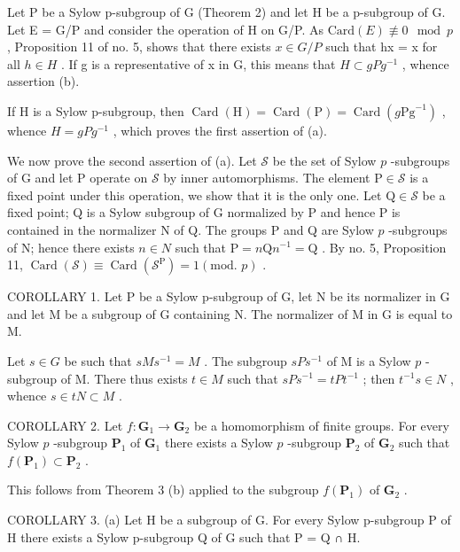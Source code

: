 Let P be a Sylow p-subgroup of G (Theorem 2) and let H be a p-subgroup of G. Let E = G/P and consider the operation of H on G/P. As \(\text{Card}(E) \not\equiv 0 \mod p\) , Proposition 11 of no. 5, shows that there exists \(x \in G/P\) such that hx = x for all \(h \in H\) . If g is a representative of x in G, this means that \(H \subset gPg^{-1}\) , whence assertion (b).

If H is a Sylow p-subgroup, then \(\operatorname{Card}(\mathrm{H}) = \operatorname{Card}(\mathrm{P}) = \operatorname{Card}(g\mathrm{Pg}^{-1})\) , whence \(H = gPg^{-1}\) , which proves the first assertion of (a).

We now prove the second assertion of (a). Let \(\mathcal{S}\) be the set of Sylow \(p\) -subgroups of G and let P operate on \(\mathcal{S}\) by inner automorphisms. The element \(\mathrm{P} \in \mathcal{S}\) is a fixed point under this operation, we show that it is the only one. Let \(\mathrm{Q} \in \mathcal{S}\) be a fixed point; Q is a Sylow subgroup of G normalized by P and hence P is contained in the normalizer N of Q. The groups P and Q are Sylow \(p\) -subgroups of N; hence there exists \(n \in N\) such that \(\mathrm{P} = n\mathrm{Q}n^{-1} = \mathrm{Q}\) . By no. 5, Proposition 11, \(\operatorname{Card}(\mathcal{S}) \equiv \operatorname{Card}(\mathcal{S}^{\mathrm{P}}) = 1 (\text{mod. } p)\) .

COROLLARY 1. Let P be a Sylow p-subgroup of G, let N be its normalizer in G and let M be a subgroup of G containing N. The normalizer of M in G is equal to M.

Let \(s \in G\) be such that \(sMs^{-1} = M\) . The subgroup \(sPs^{-1}\) of M is a Sylow \(p\) -subgroup of M. There thus exists \(t \in M\) such that \(sPs^{-1} = tPt^{-1}\) ; then \(t^{-1}s \in N\) , whence \(s \in tN \subset M\) .

COROLLARY 2. Let \(f: \mathbf{G}_{1} \to \mathbf{G}_{2}\) be a homomorphism of finite groups. For every Sylow \(p\) -subgroup \(\mathbf{P}_{1}\) of \(\mathbf{G}_{1}\) there exists a Sylow \(p\) -subgroup \(\mathbf{P}_{2}\) of \(\mathbf{G}_{2}\) such that \(f(\mathbf{P}_{1}) \subset \mathbf{P}_{2}\) .

This follows from Theorem 3 (b) applied to the subgroup \(f(\mathbf{P}_1)\) of \(\mathbf{G}_2\) .

COROLLARY 3. (a) Let H be a subgroup of G. For every Sylow p-subgroup P of H there exists a Sylow p-subgroup Q of G such that P = Q ∩ H.

